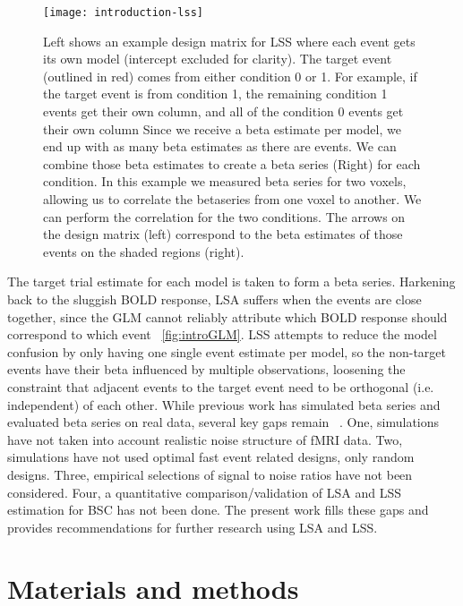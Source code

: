 \documentclass[10pt,letterpaper]{article}
\begin{document}
\begin{figure}[H]
  \centering
  \texttt{[image: introduction-lss]}
  \caption{
    Left shows an example design matrix for LSS where each event gets its own model
    (intercept excluded for clarity).
    The target event (outlined in red) comes from either condition 0 or 1.
    For example, if the target event is from condition 1, the remaining condition 1 events
    get their own column, and all of the condition 0 events get their own column
    Since we receive a beta estimate per model, we end up with as many beta estimates as there
    are events.
    We can combine those beta estimates to create a beta series (Right) for each condition.
    In this example we measured beta series for two voxels, allowing us to
    correlate the betaseries from one voxel to another.
    We can perform the correlation for the two conditions.
    The arrows on the design matrix (left) correspond to the beta estimates of those events
    on the shaded regions (right).
  }
  \label{fig:introlss}
\end{figure}

The target trial estimate for each model is taken to form a beta series.
Harkening back to the sluggish BOLD response, LSA suffers when the events are close together,
since the GLM cannot reliably attribute which BOLD response should correspond to which event ~\ref{fig:introGLM}.
LSS attempts to reduce the model confusion by only having one single event estimate per model,
so the non-target events have their beta influenced by multiple observations, loosening the
constraint that adjacent events to the target event need to be orthogonal (i.e. independent) of each other.
While previous work has simulated beta series and evaluated beta series on real data,
several key gaps remain ~\cite{Mumford2014a,Mumford2012,Turner2012a,Abdulrahman2016,Cisler2012,Arco2018}.
One, simulations have not taken into account realistic noise structure of fMRI data.
Two, simulations have not used optimal fast event related designs, only random designs. 
Three, empirical selections of signal to noise ratios have not been considered.
Four, a quantitative comparison/validation of LSA and LSS estimation for BSC has not been done.
The present work fills these gaps and provides recommendations for further research
using LSA and LSS.

\section*{Materials and methods}
\label{methods}
\end{document}

